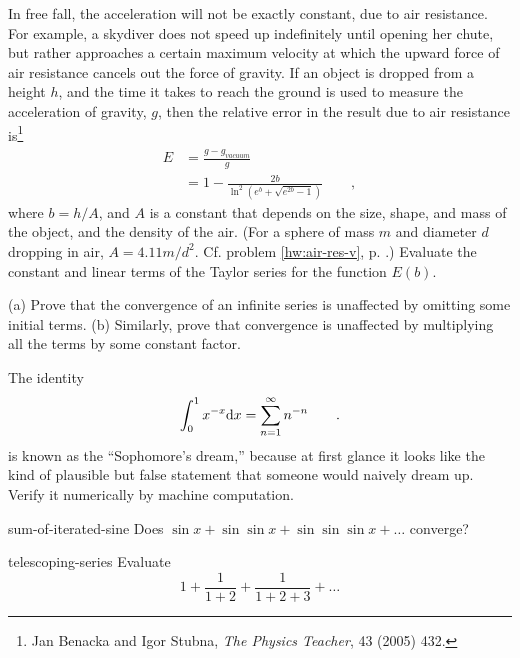 \begin{hwsection}
\begin{hw}\label{hw:air-res-taylor}
In free fall, the acceleration will not be exactly constant, due to air resistance. For example,
a skydiver does not speed up indefinitely until opening her chute, but rather approaches a certain
maximum velocity at which the upward force of air resistance cancels out the force of gravity.
If an object is dropped from a height $h$, and the time it takes to reach the ground is used to
measure the acceleration of gravity, $g$, then the relative error in the result due to air
resistance is\footnote{Jan Benacka
and Igor Stubna, \emph{The Physics Teacher}, 43 (2005) 432.}
\begin{align*}
  E &= \frac{g-g_{vacuum}}{g} \\
   & = 1-\frac{2b}{\ln^2\left(e^b+\sqrt{e^{2b}-1}\right)} \qquad ,
\end{align*}
where $b=h/A$, and
$A$ is a constant that depends on the size, shape, and mass of the object, and the density of
the air.   (For a sphere of mass $m$ and diameter $d$ dropping in air, $A=4.11m/d^2$. Cf. problem \ref{hw:air-res-v}, p. \pageref{hw:air-res-v}.)
Evaluate the constant and linear terms of the Taylor series for the function $E(b)$.
\end{hw}

\begin{hw}
(a) Prove that the convergence of an infinite series is unaffected by omitting
some initial terms. (b) Similarly, prove that convergence is unaffected by
multiplying all the terms by some constant factor.
\end{hw}

\begin{hw}
The identity
\begin{equation*}
  \int_0^1 x^{-x} \textup{d} x = \sum_{n=1}^\infty n^{-n} \qquad .
\end{equation*}
is known as the ``Sophomore's dream,'' because at first glance it looks like the
kind of plausible but false statement that someone would naively dream up.
Verify it numerically by machine computation.
\end{hw}

\begin{hwwithsoln}[2]{sum-of-iterated-sine}
Does $\sin x+\sin \sin x+\sin\sin\sin x+\ldots$ converge?
\end{hwwithsoln}

\begin{hwwithsoln}[2]{telescoping-series}
Evaluate 
\begin{equation*}
  1+\frac{1}{1+2}+\frac{1}{1+2+3}+\ldots
\end{equation*}
\end{hwwithsoln}


\end{hwsection}
